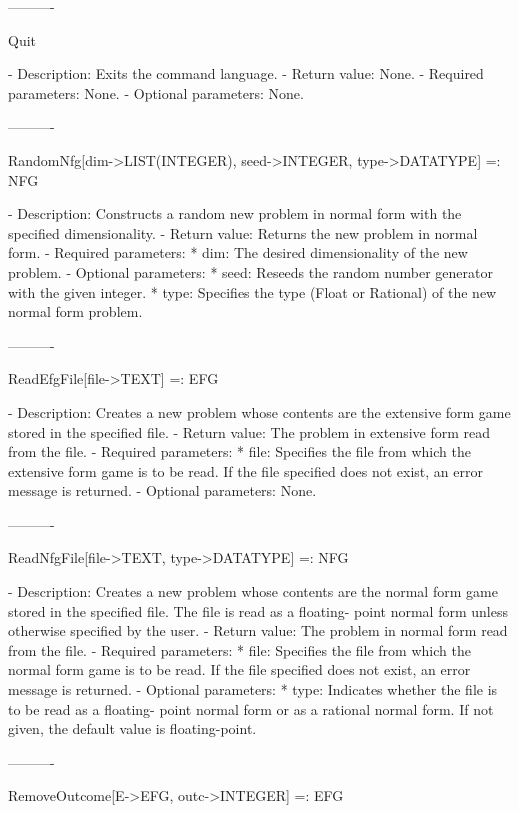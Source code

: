 ----------

Quit

   -	Description:  Exits the command language.
   -	Return value:  None.
   -	Required parameters:  None.
   -	Optional parameters:  None.

----------

RandomNfg[dim->LIST(INTEGER), {seed->INTEGER}, {type->DATATYPE}] =: NFG

   -	Description:  Constructs a random new problem in normal form with the 
	specified dimensionality.
   -	Return value:  Returns the new problem in normal form.
   -	Required parameters:
	  *  dim:  The desired dimensionality of the new problem.
   -	Optional parameters:
	  *  seed:  Reseeds the random number generator with the given integer.
	  *  type:  Specifies the type (Float or Rational) of the new normal 
		form problem.

----------

ReadEfgFile[file->TEXT] =: EFG

   -	Description:  Creates a new problem whose contents are the extensive 
	form game stored in the specified file.
   -	Return value:  The problem in extensive form read from the file.
   -	Required parameters:
	  *  file:  Specifies the file from which the extensive form game is to
		be read.  If the file specified does not exist, an error 
		message is returned.
   -	Optional parameters:  None.

----------

ReadNfgFile[file->TEXT, {type->DATATYPE}] =: NFG

   -	Description:  Creates a new problem whose contents are the normal form
	game stored in the specified file.  The file is read as a floating-
	point normal form unless otherwise specified by the user.
   -	Return value:  The problem in normal form read from the file.
   -	Required parameters:
	  *  file:  Specifies the file from which the normal form game is to be
		read.  If the file specified does not exist, an error message
		is returned.
   -	Optional parameters:
	  *  type:  Indicates whether the file is to be read as a floating-
		point normal form or as a rational normal form.  If not given,
		the default value is floating-point.

----------

RemoveOutcome[E->EFG, outc->INTEGER] =: EFG

